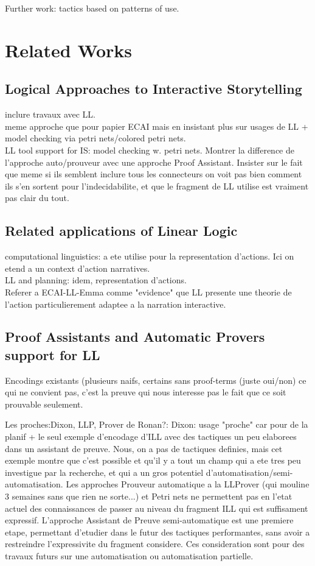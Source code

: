 \documentclass[runningheads,a4paper]{llncs}
\begin{document}
Further work: tactics based on patterns of use.
\section{Related Works}
\subsection{Logical Approaches to Interactive Storytelling}
inclure travaux avec LL.\\
meme approche que pour papier ECAI mais en insistant plus sur usages de LL + model checking via petri nets/colored petri nets.\\
LL tool support for IS: model checking w. petri nets. Montrer la difference de l'approche auto/prouveur avec une approche Proof Assistant. Insister sur le fait que meme si ils semblent inclure tous les connecteurs on voit pas bien comment ils s'en sortent pour l'indecidabilite, et que le fragment de LL utilise est vraiment pas clair du tout.
\subsection{Related applications of Linear Logic}
computational linguistics: a ete utilise pour la representation d'actions. Ici on etend a un context d'action narratives.\\
LL and planning: idem, representation d'actions.\\
Referer a ECAI-LL-Emma comme "evidence" que LL presente une theorie de l'action particulierement adaptee a la narration interactive.
\subsection{Proof Assistants and Automatic Provers support for LL}
Encodings existants (plusieurs naifs, certains sans proof-terms (juste oui/non) ce qui ne convient pas, c'est la preuve qui nous interesse pas le fait que ce soit prouvable seulement. 

Les proches:Dixon, LLP, Prover de Ronan?: 
Dixon: usage "proche" car pour de la planif + le seul exemple d'encodage d'ILL avec des tactiques un peu elaborees dans un assistant de preuve. Nous, on a pas de tactiques definies, mais cet exemple montre que c'est possible et qu'il y a tout un champ qui a ete tres peu investigue par la recherche, et qui a un gros potentiel d'automatisation/semi-automatisation. Les approches Prouveur automatique  a la LLProver (qui mouline 3 semaines sans que rien ne sorte...) et Petri nets ne permettent pas en l'etat actuel des connaissances de passer au niveau du fragment ILL qui est suffisament expressif. L'approche Assistant de Preuve semi-automatique est une premiere etape, permettant d'etudier dans le futur des tactiques performantes, sans avoir a restreindre l'expressivite du fragment considere. Ces consideration sont pour des travaux futurs sur une automatisation ou automatisation partielle.
\end{document}
